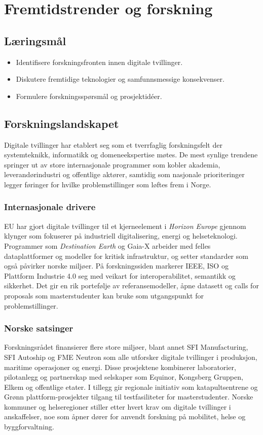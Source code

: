 \chapter{Fremtidstrender og forskning}

\section{Læringsmål}
\begin{itemize}
    \item Identifisere forskningsfronten innen digitale tvillinger.
    \item Diskutere fremtidige teknologier og samfunnsmessige konsekvenser.
    \item Formulere forskningsspørsmål og prosjektidéer.
\end{itemize}

\section{Forskningslandskapet}
Digitale tvillinger har etablert seg som et tverrfaglig forskningsfelt der systemteknikk, informatikk og domeneekspertise møtes. De mest synlige trendene springer ut av store internasjonale programmer som kobler akademia, leverandørindustri og offentlige aktører, samtidig som nasjonale prioriteringer legger føringer for hvilke problemstillinger som løftes frem i Norge.

\subsection{Internasjonale drivere}
EU har gjort digitale tvillinger til et kjerneelement i \emph{Horizon Europe} gjennom klynger som fokuserer på industriell digitalisering, energi og helseteknologi. Programmer som \emph{Destination Earth} og Gaia-X arbeider med felles dataplattformer og modeller for kritisk infrastruktur, og setter standarder som også påvirker norske miljøer. På forskningssiden markerer IEEE, ISO og Plattform Industrie 4.0 seg med veikart for interoperabilitet, semantikk og sikkerhet. Det gir en rik portefølje av referansemodeller, åpne datasett og calls for proposals som masterstudenter kan bruke som utgangspunkt for problemstillinger.

\subsection{Norske satsinger}
Forskningsrådet finansierer flere store miljøer, blant annet SFI Manufacturing, SFI Autoship og FME Neutron som alle utforsker digitale tvillinger i produksjon, maritime operasjoner og energi. Disse prosjektene kombinerer laboratorier, pilotanlegg og partnerskap med selskaper som Equinor, Kongsberg Gruppen, Elkem og offentlige etater. I tillegg gir regionale initiativ som katapultsentrene og Grønn plattform-prosjekter tilgang til testfasiliteter for masterstudenter. Norske kommuner og helseregioner stiller etter hvert krav om digitale tvillinger i anskaffelser, noe som åpner dører for anvendt forskning på mobilitet, helse og byggforvaltning.

